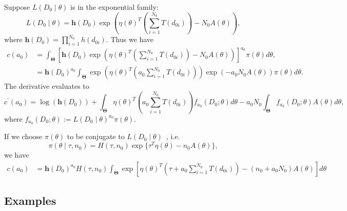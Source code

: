 \documentclass[a4paper, notitlepage, 11pt]{article}
\begin{document}
Suppose $L(D_0 \mid \theta)$ is in the exponential family:
\begin{equation}
 L(D_0 \mid \theta) = \boldsymbol h(D_0) \exp \left( \eta(\theta)^T \left(\sum_{i=1}^{N_0} T(d_{0i}) \right) - N_0 A(\theta) \right),
\end{equation}
where $\boldsymbol h(D_0) = \prod_{i = 1}^{N_0} h(d_{0i})$.
Thus we have
\begin{align}
 c(a_0) &=  \int_{\boldsymbol\Theta} \left[ \boldsymbol h(D_0) \exp \left( \eta(\theta)^T \left(\sum_{i=1}^{N_0} T(d_{0i}) \right) - N_0 A(\theta) \right) \right]^{a_0}\pi(\theta) d\theta, \\
  \label{eq:expo_family_const}
 &= \boldsymbol h(D_0)^{a_0}\int_{\boldsymbol\Theta} \exp \left( \eta(\theta)^T \left(a_0 \sum_{i=1}^{N_0} T(d_{0i}) \right) \right) \exp\left(- a_0N_0 A(\theta) \right) \pi(\theta) d\theta.
\end{align}
The derivative evaluates to 
\begin{equation}
\label{eq:expo_family_deriv_general}
 c^\prime(a_0) = \log(\boldsymbol h(D_0)) + \int_{\boldsymbol\Theta} \eta(\theta)^T \left(a_0 \sum_{i=1}^{N_0} T(d_{0i}) \right) f_{a_0}(D_0; \theta) d\theta -  a_0N_0\int_{\boldsymbol\Theta} f_{a_0}(D_0; \theta)  A(\theta) d\theta,
\end{equation}
where $f_{a_0}(D_0; \theta) := L(D_0 \mid \theta)^{a_0}\pi(\theta)$.

If we choose $\pi(\theta)$ to be conjugate to $L(D_0 \mid \theta)$~\citep{Diaconis1979}, i.e.
\begin{equation}
 \label{eq:conj_exp_family}
 \pi(\theta \mid \tau, n_0) = H(\tau, n_0) \exp\{ \tau^T\eta(\theta) - n_0A(\theta) \},
\end{equation}
we have 
\begin{align}
 \label{eq:expo_family_const_conj}
 c(a_0) &= \boldsymbol h(D_0)^{a_0} H(\tau, n_0) \int_{\boldsymbol\Theta}  \exp \left[ \eta(\theta)^T \left( \tau + a_0\sum_{i=1}^{N_0} T(d_{0i}) \right) -(n_0  + a_0N_0) A(\theta) \right] d\theta
\end{align}

\subsection{Examples}
\end{document}
